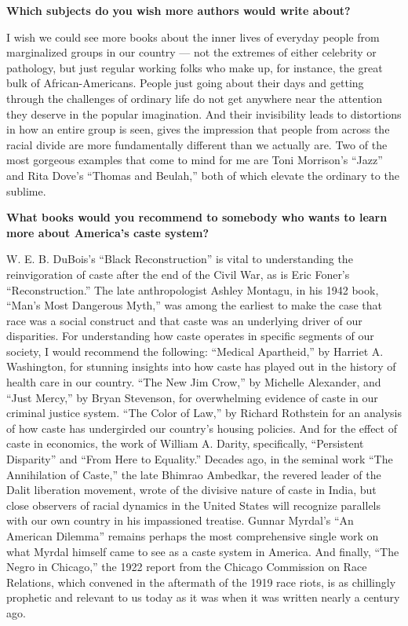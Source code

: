\textbf{Which subjects do you wish more authors would write about?}

I wish we could see more books about the inner lives of everyday people
from marginalized groups in our country --- not the extremes of either
celebrity or pathology, but just regular working folks who make up, for
instance, the great bulk of African-Americans. People just going about
their days and getting through the challenges of ordinary life do not
get anywhere near the attention they deserve in the popular imagination.
And their invisibility leads to distortions in how an entire group is
seen, gives the impression that people from across the racial divide are
more fundamentally different than we actually are. Two of the most
gorgeous examples that come to mind for me are Toni Morrison's ``Jazz''
and Rita Dove's ``Thomas and Beulah,'' both of which elevate the
ordinary to the sublime.

\textbf{What books would you recommend to somebody who wants to learn
more about America's caste system?}

W. E. B. DuBois's ``Black Reconstruction'' is vital to understanding the
reinvigoration of caste after the end of the Civil War, as is Eric
Foner's ``Reconstruction.'' The late anthropologist Ashley Montagu, in
his 1942 book, ``Man's Most Dangerous Myth,'' was among the earliest to
make the case that race was a social construct and that caste was an
underlying driver of our disparities. For understanding how caste
operates in specific segments of our society, I would recommend the
following: ``Medical Apartheid,'' by Harriet A. Washington, for stunning
insights into how caste has played out in the history of health care in
our country. ``The New Jim Crow,'' by Michelle Alexander, and ``Just
Mercy,'' by Bryan Stevenson, for overwhelming evidence of caste in our
criminal justice system. ``The Color of Law,'' by Richard Rothstein for
an analysis of how caste has undergirded our country's housing policies.
And for the effect of caste in economics, the work of William A. Darity,
specifically, ``Persistent Disparity'' and ``From Here to Equality.''
Decades ago, in the seminal work ``The Annihilation of Caste,'' the late
Bhimrao Ambedkar, the revered leader of the Dalit liberation movement,
wrote of the divisive nature of caste in India, but close observers of
racial dynamics in the United States will recognize parallels with our
own country in his impassioned treatise. Gunnar Myrdal's ``An American
Dilemma'' remains perhaps the most comprehensive single work on what
Myrdal himself came to see as a caste system in America. And finally,
``The Negro in Chicago,'' the 1922 report from the Chicago Commission on
Race Relations, which convened in the aftermath of the 1919 race riots,
is as chillingly prophetic and relevant to us today as it was when it
was written nearly a century ago.

